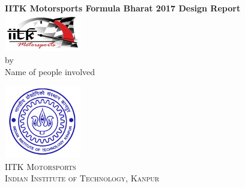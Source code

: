 \begin{titlepage}
	
	\begin{center}
		
		\Large \textbf {IITK Motorsports Formula Bharat 2017 Design Report}\\[0.5in]
		
		\vspace{3in}
		\includegraphics[width=0.25\textwidth]{fig/iitkmslogo}\\[0.1in]
		
		\normalsize  by\\ Name of people involved
		
		
		\vfill
		
		\includegraphics[width=0.25\textwidth]{fig/iitklogo}\\[0.1in]
		
		\textsc{IITK Motorsports}\\
		\textsc{Indian Institute of Technology, Kanpur}
		
		
	\end{center}
	
\end{titlepage}
